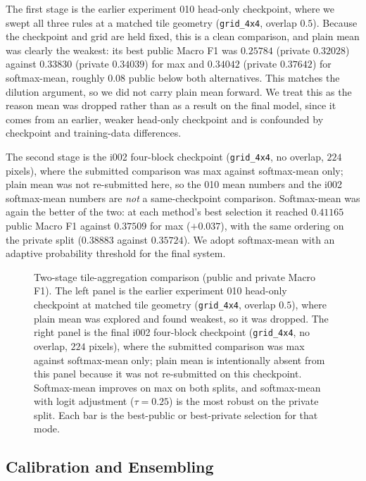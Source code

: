 The first stage is the earlier experiment 010 head-only checkpoint, where we swept all three
rules at a matched tile geometry (\texttt{grid\_4x4}, overlap $0.5$). Because
the checkpoint and grid are held fixed, this is a clean comparison, and plain mean was clearly
the weakest: its best public Macro F1 was $0.25784$ (private $0.32028$) against $0.33830$
(private $0.34039$) for max and $0.34042$ (private $0.37642$) for softmax-mean, roughly $0.08$
public below both alternatives. This matches the dilution argument, so we did not carry plain
mean forward. We treat this as the reason mean was dropped rather than as a result on the final
model, since it comes from an earlier, weaker head-only checkpoint and is confounded by
checkpoint and training-data differences.

The second stage is the i002 four-block checkpoint (\texttt{grid\_4x4}, no overlap,
$224$ pixels), where the submitted comparison was max against softmax-mean only; plain mean was
not re-submitted here, so the 010 mean numbers and the i002 softmax-mean numbers are
\emph{not} a same-checkpoint comparison. Softmax-mean was again the better of the two: at each
method's best selection it reached $0.41165$ public Macro F1 against $0.37509$ for max
($+0.037$), with the same ordering on the private split ($0.38883$ against $0.35724$). We adopt
softmax-mean with an adaptive probability threshold for the final system.

\begin{figure}[t]
  \centering
  
  \caption{Two-stage tile-aggregation comparison (public and private Macro F1). The left panel is the earlier experiment 010 head-only checkpoint at matched tile geometry (\texttt{grid\_4x4}, overlap $0.5$), where plain mean was explored and found weakest, so it was dropped. The right panel is the final i002 four-block checkpoint (\texttt{grid\_4x4}, no overlap, $224$ pixels), where the submitted comparison was max against softmax-mean only; plain mean is intentionally absent from this panel because it was not re-submitted on this checkpoint. Softmax-mean improves on max on both splits, and softmax-mean with logit adjustment ($\tau{=}0.25$) is the most robust on the private split. Each bar is the best-public or best-private selection for that mode.}
  \label{fig:aggregation_results}
\end{figure}

\subsection{Calibration and Ensembling}
\label{sec:infer_ablations}

